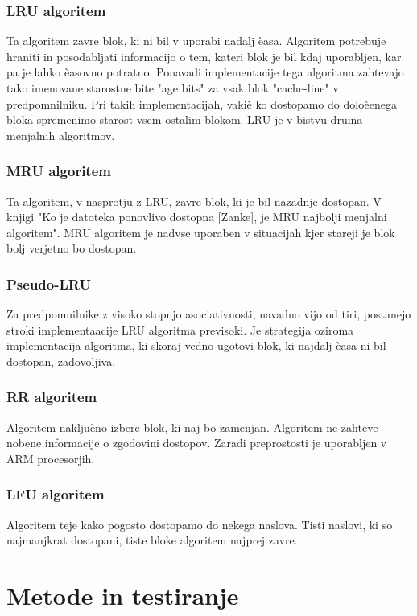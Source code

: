 \documentclass[12pt,a4paper,openany]{book}
\begin{document}
\subsection{LRU algoritem}
Ta algoritem zavre blok, ki ni bil v uporabi nadalj èasa. Algoritem potrebuje hraniti in posodabljati informacijo o tem, kateri blok
je bil kdaj uporabljen, kar pa je lahko èasovno potratno. Ponavadi implementacije tega algoritma zahtevajo tako imenovane starostne bite "age bits" za vsak blok "cache-line" v predpomnilniku. Pri takih implementacijah, vakiè ko dostopamo do doloèenega bloka
spremenimo starost vsem ostalim blokom. LRU je v bistvu druina menjalnih algoritmov.

\subsection{MRU algoritem}
Ta algoritem, v nasprotju z LRU, zavre blok, ki je bil nazadnje dostopan. V knjigi \cite{VLDB1} "Ko je datoteka ponovlivo dostopna
[Zanke], je MRU najbolji menjalni algoritem". MRU algoritem je nadvse uporaben v situacijah kjer stareji je blok bolj verjetno bo
dostopan.

\subsection{Pseudo-LRU}
Za predpomnilnike z visoko stopnjo asociativnosti, navadno vijo od tiri, postanejo stroki implementaacije LRU algoritma previsoki.
Je strategija oziroma implementacija algoritma, ki skoraj vedno ugotovi blok, ki najdalj èasa ni bil dostopan, zadovoljiva.

\subsection{RR algoritem}
Algoritem nakljuèno izbere blok, ki naj bo zamenjan. Algoritem ne zahteve nobene informacije o zgodovini dostopov. Zaradi preprostosti
je uporabljen v ARM procesorjih.

\subsection{LFU algoritem}
Algoritem teje kako pogosto dostopamo do nekega naslova. Tisti naslovi, ki so najmanjkrat dostopani, tiste bloke algoritem najprej zavre.

\chapter{Metode in testiranje}
\end{document}
